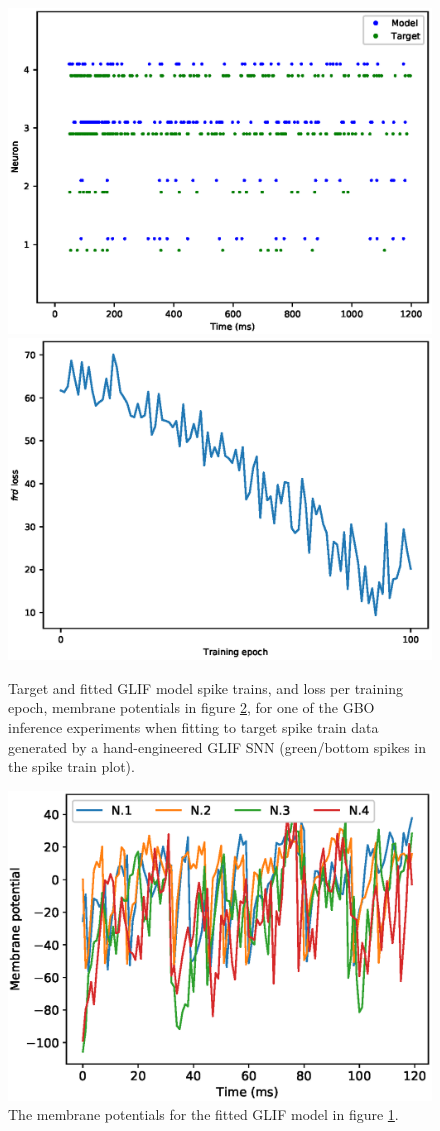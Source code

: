 \documentclass[mphil,deptreport,ianc]{infthesis} %
\begin{document}
\begin{figure}
    \centering
    \includegraphics[width=0.49\columnwidth]{figures/samples/SameModelClassTarget/export_spike_trains_euid_12-10_09-45-02-423.eps}
    \includegraphics[width=0.49\columnwidth]{figures/samples/SameModelClassTarget/export_GLIF_plot_loss_euid_12-09_16-17-13-464.eps}
    \caption{Target and fitted GLIF model spike trains, and loss per training epoch, membrane potentials in figure \ref{fig:sample_GLIF_vs}, for one of the GBO inference experiments when fitting to target spike train data generated by a hand-engineered GLIF SNN (green/bottom spikes in the spike train plot).}
    \label{fig:sample_GLIF_spikes_loss}
\end{figure}

\begin{figure}
    \centering
    \includegraphics[width=0.6\columnwidth]{figures/samples/membrane_potentials/export_sample_GLIF_white_noise.eps}
    \caption{The membrane potentials for the fitted GLIF model in figure \ref{fig:sample_GLIF_spikes_loss}.}
    \label{fig:sample_GLIF_vs}
\end{figure}
\end{document}
